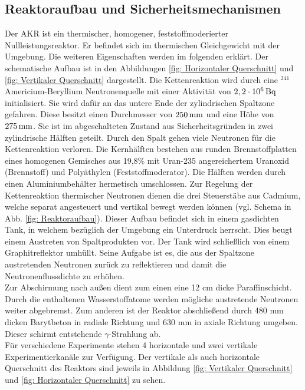 	\subsection{Reaktoraufbau und Sicherheitsmechanismen}
	Der AKR ist ein thermischer, homogener, feststoffmoderierter Nullleistungsreaktor. Er befindet sich im thermischen Gleichgewicht mit der Umgebung. Die weiteren Eigenschaften werden im folgenden erklärt.
	Der schematische Aufbau ist in den Abbildungen \ref{fig: Horizontaler Querschnitt} und \ref{fig: Vertikaler Querschnitt} dargestellt. Die Kettenreaktion wird durch eine $ ^{241} $Americium-Beryllium Neutronenquelle mit einer Aktivität von $\unit[2,2 \cdot 10^{6}] {Bq}$ initialisiert. Sie wird dafür an das untere Ende der zylindrischen Spaltzone gefahren. Diese besitzt einen Durchmesser von $\unit[250]{mm}$ und eine Höhe von $\unit[275]{mm}$. Sie ist im abgeschalteten Zustand aus Sicherheitsgründen in zwei zylindrische Hälften geteilt. Durch den Spalt gehen viele Neutronen für die Kettenreaktion verloren. Die Kernhälften bestehen aus runden Brennstoffplatten eines homogenen Gemisches aus 19,8\% mit Uran-235 angereichertem Uranoxid (Brennstoff) und Polyäthylen (Feststoffmoderator). Die Hälften werden durch einen Aluminiumbehälter hermetisch umschlossen. Zur Regelung der Kettenreaktion thermischer Neutronen dienen die drei Steuerstäbe aus Cadmium, welche separat angesteuert und vertikal bewegt werden können (vgl. Schema in Abb. \ref{fig: Reaktoraufbau}). Dieser Aufbau befindet sich in einem gasdichten Tank, in welchem bezüglich der Umgebung ein Unterdruck herrscht. Dies beugt einem Austreten von Spaltprodukten vor. Der Tank wird schließlich von einem Graphitreflektor umhüllt. Seine Aufgabe ist es, die aus der Spaltzone austretenden Neutronen zurück zu reflektieren und damit die Neutronenflussdichte zu erhöhen.\\
	Zur Abschirmung nach außen dient zum einen eine 12 cm dicke Paraffinschicht. Durch die enthaltenen Wasserstoffatome werden mögliche austretende Neutronen weiter abgebremst. %
	Zum anderen ist der Reaktor abschließend durch 480 mm dicken Barytbeton in radiale Richtung und 630 mm in axiale Richtung umgeben. Dieser schirmt entstehende $\gamma$-Strahlung ab.\\
	Für verschiedene Experimente stehen 4 horizontale und zwei vertikale Experimentierkanäle zur Verfügung. Der vertikale als auch horizontale Querschnitt des Reaktors sind jeweils in Abbildung \ref{fig: Vertikaler Querschnitt} und \ref{fig: Horizontaler Querschnitt} zu sehen.
	
